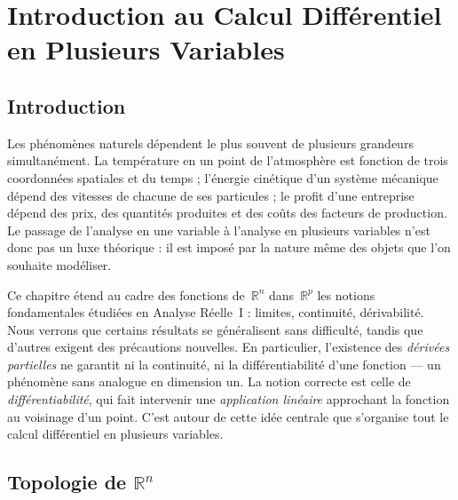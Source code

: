 \documentclass[12pt,a4paper,openany]{book}
\theoremstyle{definition}
\newcommand{\R}{\mathbb{R}}
\begin{document}

\chapter{Introduction au Calcul Différentiel en Plusieurs Variables}
\label{chap:calcul-diff-plusieurs-variables}

\section*{Introduction}

Les phénomènes naturels dépendent le plus souvent de plusieurs grandeurs simultanément. La température en un point de l'atmosphère est fonction de trois coordonnées spatiales et du temps ; l'énergie cinétique d'un système mécanique dépend des vitesses de chacune de ses particules ; le profit d'une entreprise dépend des prix, des quantités produites et des coûts des facteurs de production. Le passage de l'analyse en une variable à l'analyse en plusieurs variables n'est donc pas un luxe théorique : il est imposé par la nature même des objets que l'on souhaite modéliser.

Ce chapitre étend au cadre des fonctions de~$\R^n$ dans~$\R^p$ les notions fondamentales étudiées en Analyse Réelle~I : limites, continuité, dérivabilité. Nous verrons que certains résultats se généralisent sans difficulté, tandis que d'autres exigent des précautions nouvelles. En particulier, l'existence des \emph{dérivées partielles} ne garantit ni la continuité, ni la différentiabilité d'une fonction --- un phénomène sans analogue en dimension un. La notion correcte est celle de \emph{différentiabilité}, qui fait intervenir une \emph{application linéaire} approchant la fonction au voisinage d'un point. C'est autour de cette idée centrale que s'organise tout le calcul différentiel en plusieurs variables.

\section{Topologie de \texorpdfstring{$\R^n$}{Rn}}
\label{sec:topologie-Rn}
\index{topologie!de $\R^n$}
\end{document}
